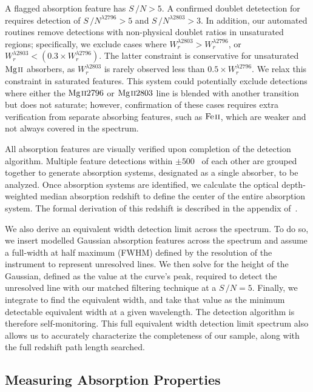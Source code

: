 \documentclass[iop,apj,numberedappendix,appendixfloats,twocolappendix]{emulateapj}
\begin{document}
A flagged absorption feature has $S\,/N > 5$. A confirmed doublet detetection for {\MgIIdblt} requires detection of $S\,/N^{\lambda2796} > 5$ and $S\,/N^{\lambda2803} > 3$. In addition, our automated routines remove detections with non-physical doublet ratios in unsaturated regions; specifically, we exclude cases where $W_r^{\lambda2803} > W_r^{\lambda2796}$, or $W_r^{\lambda2803} < \left(0.3 \times W_r^{\lambda2796}\right)$. The latter constraint is conservative for unsaturated ${\hbox{{\rm Mg}\kern 0.1em{\sc ii}}}$ absorbers, as $W_r^{\lambda2803}$ is rarely observed less than $0.5 \times W_r^{\lambda2796}$. We relax this constraint in saturated features. This system could potentially exclude detections where either the ${\hbox{{\rm Mg}\kern 0.1em{\sc ii}}2796}$ or ${\hbox{{\rm Mg}\kern 0.1em{\sc ii}}2803}$ line is blended with another transition but does not saturate; however, confirmation of these cases requires extra verification from separate absorbing features, such as ${\hbox{{\rm Fe}\kern 0.1em{\sc ii}}}$, which are weaker and not always covered in the spectrum.

All absorption features are visually verified upon completion of the detection algorithm. Multiple feature detections within $\pm 500$~{\kms} of each other are grouped together to generate absorption systems, designated as a single absorber, to be analyzed. Once absorption systems are identified, we calculate the optical depth-weighted median absorption redshift to define the center of the entire absorption system. The formal derivation of this redshift is described in the appendix of~\cite{Churchill2001}.

We also derive an equivalent width detection limit across the spectrum. To do so, we insert modelled Gaussian absorption features across the spectrum and assume a full-width at half maximum (FWHM) defined by the resolution of the instrument to represent unresolved lines. We then solve for the height of the Gaussian, defined as the value at the curve's peak, required to detect the unresolved line with our matched filtering technique at a $S\,/N = 5$. Finally, we integrate to find the equivalent width, and take that value as the minimum detectable equivalent width at a given wavelength. The detection algorithm is therefore self-monitoring. This full equivalent width detection limit spectrum also allows us to accurately characterize the completeness of our sample, along with the full redshift path length searched.


\subsection{Measuring Absorption Properties}
\label{sec:measuring}
\end{document}
